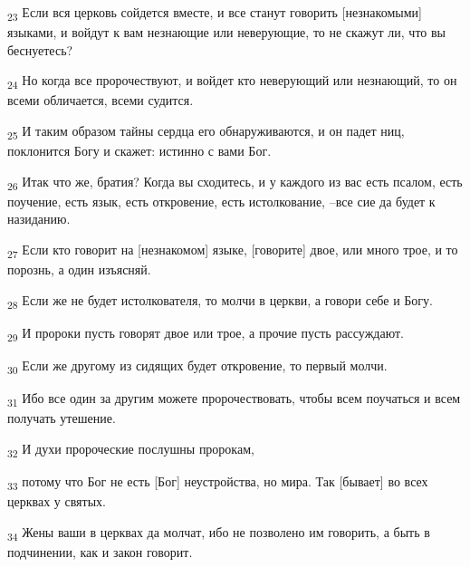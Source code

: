 \begin{tcolorbox}
\textsubscript{23} Если вся церковь сойдется вместе, и все станут говорить [незнакомыми] языками, и войдут к вам незнающие или неверующие, то не скажут ли, что вы беснуетесь?
\end{tcolorbox}
\begin{tcolorbox}
\textsubscript{24} Но когда все пророчествуют, и войдет кто неверующий или незнающий, то он всеми обличается, всеми судится.
\end{tcolorbox}
\begin{tcolorbox}
\textsubscript{25} И таким образом тайны сердца его обнаруживаются, и он падет ниц, поклонится Богу и скажет: истинно с вами Бог.
\end{tcolorbox}
\begin{tcolorbox}
\textsubscript{26} Итак что же, братия? Когда вы сходитесь, и у каждого из вас есть псалом, есть поучение, есть язык, есть откровение, есть истолкование, --все сие да будет к назиданию.
\end{tcolorbox}
\begin{tcolorbox}
\textsubscript{27} Если кто говорит на [незнакомом] языке, [говорите] двое, или много трое, и то порознь, а один изъясняй.
\end{tcolorbox}
\begin{tcolorbox}
\textsubscript{28} Если же не будет истолкователя, то молчи в церкви, а говори себе и Богу.
\end{tcolorbox}
\begin{tcolorbox}
\textsubscript{29} И пророки пусть говорят двое или трое, а прочие пусть рассуждают.
\end{tcolorbox}
\begin{tcolorbox}
\textsubscript{30} Если же другому из сидящих будет откровение, то первый молчи.
\end{tcolorbox}
\begin{tcolorbox}
\textsubscript{31} Ибо все один за другим можете пророчествовать, чтобы всем поучаться и всем получать утешение.
\end{tcolorbox}
\begin{tcolorbox}
\textsubscript{32} И духи пророческие послушны пророкам,
\end{tcolorbox}
\begin{tcolorbox}
\textsubscript{33} потому что Бог не есть [Бог] неустройства, но мира. Так [бывает] во всех церквах у святых.
\end{tcolorbox}
\begin{tcolorbox}
\textsubscript{34} Жены ваши в церквах да молчат, ибо не позволено им говорить, а быть в подчинении, как и закон говорит.
\end{tcolorbox}
